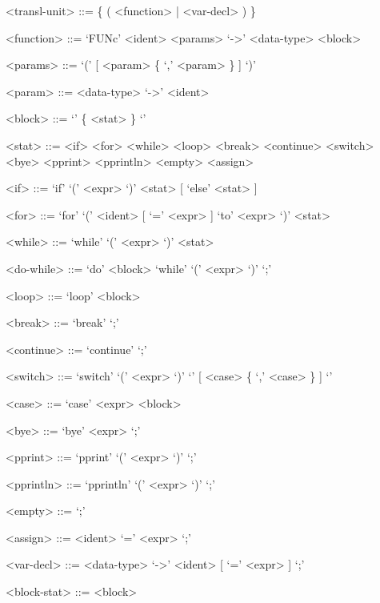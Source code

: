 \documentclass[12pt, a4paper]{article}
\begin{document}
    \setlength{\grammarparsep}{0.6em} %
    \setlength{\grammarindent}{10em} %

    \begin{grammar}

        <transl-unit> ::= \{ ( <function> | <var-decl> ) \}

        <function> ::= `FUNc' <ident> <params> `->' <data-type> <block>

        <params> ::= `(' [ <param> \{ `,' <param> \} ] `)'

        <param> ::= <data-type> `->' <ident>

        <block> ::= `{' \{ <stat> \} `}'

        <stat> ::= <if>
        \alt <for>
        \alt <while>
        \alt <loop>
        \alt <break>
        \alt <continue>
        \alt <switch>
        \alt <bye>
        \alt <pprint>
        \alt <pprintln>
        \alt <empty>
        \alt <assign>

        <if> ::= `if' `(' <expr> `)' <stat> [ `else' <stat> ]

        <for> ::= `for' `(' <ident> [ `=' <expr> ] `to' <expr> `)' <stat>

        <while> ::= `while' `(' <expr> `)' <stat>

        <do-while> ::= `do' <block> `while' `(' <expr> `)' `;'

        <loop> ::= `loop' <block>

        <break> ::= `break' `;'

        <continue> ::= `continue' `;'

        <switch> ::= `switch' `(' <expr> `)' `{' [ <case> \{ `,' <case> \} ] `}'

        <case> ::= `case' <expr> <block>

        <bye> ::= `bye' <expr> `;'

        <pprint> ::= `pprint' `(' <expr> `)' `;'

        <pprintln> ::= `pprintln' `(' <expr> `)' `;'

        <empty> ::= `;'

        <assign> ::= <ident> `=' <expr> `;'

        <var-decl> ::= <data-type> `->' <ident> [ `=' <expr> ] `;'

        <block-stat> ::= <block>


\end{grammar}
\end{document}
